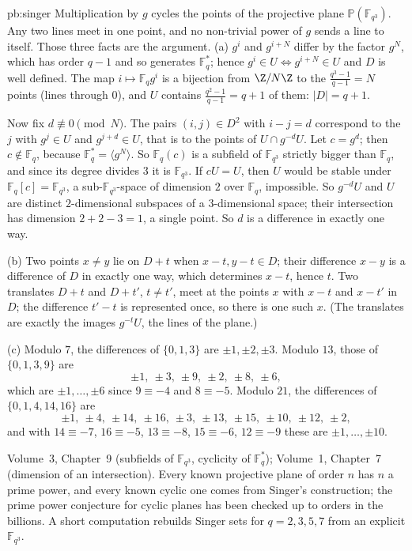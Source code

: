 \begin{solution}{pb:singer}
\idea Multiplication by $g$ cycles the points of the projective plane $\mathbb P(\mathbb F_{q^3})$. Any two lines meet in one point, and no non-trivial power of $g$ sends a line to itself. Those three facts are the argument.
\writeup (a) $g^i$ and $g^{i+N}$ differ by the factor $g^N$, which has order $q-1$ and so generates $\mathbb F_q^*$; hence
$g^i\in U\iff g^{i+N}\in U$ and $D$ is well defined. The map $i\mapsto\mathbb F_qg^i$ is a bijection from $\Z/N\Z$ to the
$\frac{q^3-1}{q-1}=N$ points (lines through $0$), and $U$ contains $\frac{q^2-1}{q-1}=q+1$ of them: $|D|=q+1$.

Now fix $d\not\equiv0\pmod N$. The pairs $(i,j)\in D^2$ with $i-j=d$ correspond to the $j$ with $g^j\in U$ and $g^{j+d}\in U$, that is
to the points of $U\cap g^{-d}U$. Let $c=g^d$; then $c\notin\mathbb F_q$, because $\mathbb F_q^*=\langle g^N\rangle$. So
$\mathbb F_q(c)$ is a subfield of $\mathbb F_{q^3}$ strictly bigger than $\mathbb F_q$, and since its degree divides $3$ it is
$\mathbb F_{q^3}$. If $cU=U$, then $U$ would be stable under $\mathbb F_q[c]=\mathbb F_{q^3}$, a sub-$\mathbb F_{q^3}$-space of dimension
$2$ over $\mathbb F_q$, impossible. So $g^{-d}U$ and $U$ are distinct $2$-dimensional subspaces of a $3$-dimensional space; their
intersection has dimension $2+2-3=1$, a single point. So $d$ is a difference in exactly one way.

(b) Two points $x\ne y$ lie on $D+t$ when $x-t,y-t\in D$; their difference $x-y$ is a difference of $D$ in exactly one way, which
determines $x-t$, hence $t$. Two translates $D+t$ and $D+t'$, $t\ne t'$, meet at the points $x$ with $x-t$ and $x-t'$ in $D$; the
difference $t'-t$ is represented once, so there is one such $x$. (The translates are exactly the images $g^{-t}U$, the lines of the
plane.)

(c) Modulo $7$, the differences of $\{0,1,3\}$ are $\pm1,\pm2,\pm3$. Modulo $13$, those of $\{0,1,3,9\}$ are
\[
\pm1,\ \pm3,\ \pm9,\ \pm2,\ \pm8,\ \pm6,
\]
which are $\pm1,\dots,\pm6$ since $9\equiv-4$ and $8\equiv-5$. Modulo $21$, the differences of $\{0,1,4,14,16\}$ are
\[
\pm1,\ \pm4,\ \pm14,\ \pm16,\ \pm3,\ \pm13,\ \pm15,\ \pm10,\ \pm12,\ \pm2,
\]
and with $14\equiv-7$, $16\equiv-5$, $13\equiv-8$, $15\equiv-6$, $12\equiv-9$ these are $\pm1,\dots,\pm10$.

\tools Volume~3, Chapter~9 (subfields of $\mathbb F_{q^3}$, cyclicity of $\mathbb F_q^*$); Volume~1, Chapter~7 (dimension of an
intersection).
\leads Every known projective plane of order $n$ has $n$ a prime power, and every known cyclic one comes from Singer's construction;
the prime power conjecture for cyclic planes has been checked up to orders in the billions. A short computation rebuilds Singer sets for
$q=2,3,5,7$ from an explicit $\mathbb F_{q^3}$.
\end{solution}

